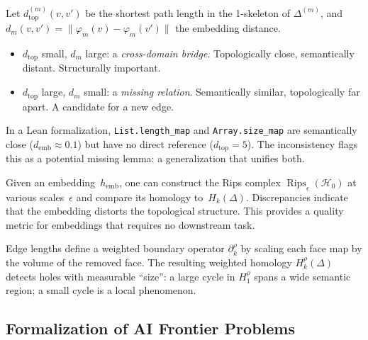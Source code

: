 \begin{definition}
Let $d_{\mathrm{top}}^{(m)}(v,v')$ be the shortest path length in the 1-skeleton of $\Delta^{(m)}$, and $d_m(v,v') = \|\varphi_m(v) - \varphi_m(v')\|$ the embedding distance.
\begin{itemize}
\item $d_{\mathrm{top}}$ small, $d_m$ large: a \emph{cross-domain bridge}. Topologically close, semantically distant. Structurally important.
\item $d_{\mathrm{top}}$ large, $d_m$ small: a \emph{missing relation}. Semantically similar, topologically far apart. A candidate for a new edge.
\end{itemize}
\end{definition}

\begin{example}
In a Lean formalization, \texttt{List.length\_map} and \texttt{Array.size\_map} are semantically close ($d_{\mathrm{emb}} \approx 0.1$) but have no direct reference ($d_{\mathrm{top}} = 5$). The inconsistency flags this as a potential missing lemma: a generalization that unifies both.
\end{example}

\begin{remark}
Given an embedding~$h_{\mathrm{emb}}$, one can construct the Rips complex $\operatorname{Rips}_\epsilon(\mathcal{H}_0)$ at various scales~$\epsilon$ and compare its homology to~$H_k(\Delta)$. Discrepancies indicate that the embedding distorts the topological structure. This provides a quality metric for embeddings that requires no downstream task.
\end{remark}

\begin{definition}
Edge lengths define a weighted boundary operator $\partial_k^{\rho}$ by scaling each face map by the volume of the removed face. The resulting weighted homology $H_k^{\rho}(\Delta)$ detects holes with measurable ``size'': a large cycle in $H_1^{\rho}$ spans a wide semantic region; a small cycle is a local phenomenon.
\end{definition}


\subsection{Formalization of AI Frontier Problems}\label{sec:ai-frontier}

